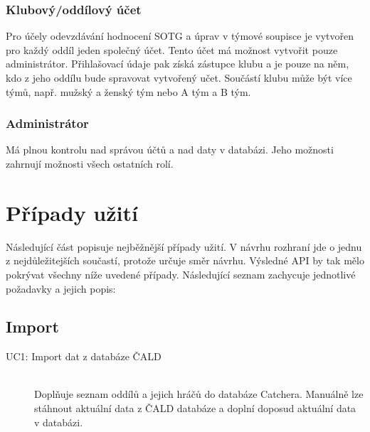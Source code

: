 \subsubsection*{Klubový/oddílový účet}

Pro účely odevzdávání hodnocení SOTG a úprav v týmové soupisce je vytvořen pro každý oddíl
jeden společný účet. Tento účet má možnost vytvořit pouze administrátor. Přihlašovací údaje pak
získá zástupce klubu a je pouze na něm, kdo z jeho oddílu bude spravovat vytvořený učet.
Součástí klubu může být více týmů, např. mužský a ženský tým nebo A tým a B tým.
  
\subsubsection*{Administrátor}
Má plnou kontrolu nad správou účtů a nad daty v databázi. Jeho možnosti zahrnují možnosti
všech ostatních rolí.

\section{Případy užití}
\label{sec:use_case}

Následující část popisuje nejběžnější případy užití. V návrhu rozhraní jde
o jednu z nejdůležitejších součastí, protože určuje směr návrhu. Výsledné API by tak mělo
pokrývat všechny níže uvedené případy. Následující seznam zachycuje jednotlivé požadavky
a jejich popis:


\subsection*{Import}
  \begin{description}
    \item[UC1: Import dat z databáze ČALD] \hfill \\
    Doplňuje seznam oddílů a jejich hráčů do databáze Catchera. Manuálně lze stáhnout
    aktuální data z ČALD databáze a doplní doposud aktuální data v databázi.
  \end{description}

